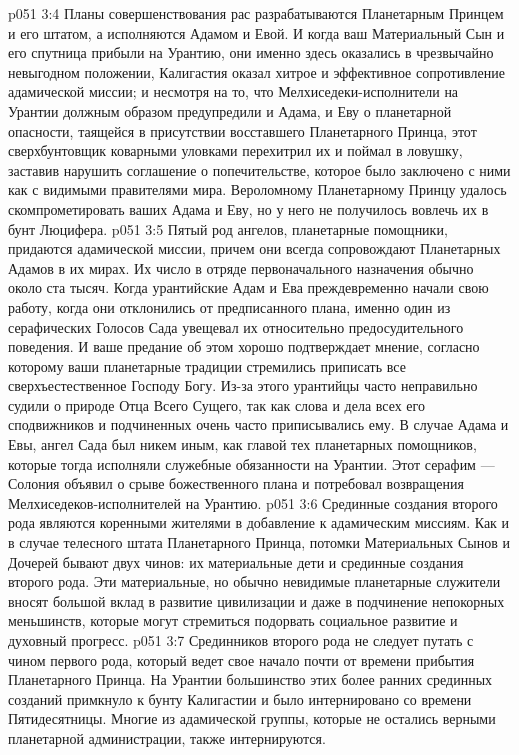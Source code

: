 \vs p051 3:4 Планы совершенствования рас разрабатываются Планетарным Принцем и его штатом, а исполняются Адамом и Евой. И когда ваш Материальный Сын и его спутница прибыли на Урантию, они именно здесь оказались в чрезвычайно невыгодном положении, Калигастия оказал хитрое и эффективное сопротивление адамической миссии; и несмотря на то, что Мелхиседеки\hyp{}исполнители на Урантии должным образом предупредили и Адама, и Еву о планетарной опасности, таящейся в присутствии восставшего Планетарного Принца, этот сверхбунтовщик коварными уловками перехитрил их и поймал в ловушку, заставив нарушить соглашение о попечительстве, которое было заключено с ними как с видимыми правителями мира. Вероломному Планетарному Принцу удалось скомпрометировать ваших Адама и Еву, но у него не получилось вовлечь их в бунт Люцифера.
\vs p051 3:5 \pc Пятый род ангелов, планетарные помощники, придаются адамической миссии, причем они всегда сопровождают Планетарных Адамов в их мирах. Их число в отряде первоначального назначения обычно около ста тысяч. Когда урантийские Адам и Ева преждевременно начали свою работу, когда они отклонились от предписанного плана, именно один из серафических Голосов Сада увещевал их относительно предосудительного поведения. И ваше предание об этом хорошо подтверждает мнение, согласно которому ваши планетарные традиции стремились приписать все сверхъестественное Господу Богу. Из\hyp{}за этого урантийцы часто неправильно судили о природе Отца Всего Сущего, так как слова и дела всех его сподвижников и подчиненных очень часто приписывались ему. В случае Адама и Евы, ангел Сада был никем иным, как главой тех планетарных помощников, которые тогда исполняли служебные обязанности на Урантии. Этот серафим --- Солония объявил о срыве божественного плана и потребовал возвращения Мелхиседеков\hyp{}исполнителей на Урантию.
\vs p051 3:6 \pc Срединные создания второго рода являются коренными жителями в добавление к адамическим миссиям. Как и в случае телесного штата Планетарного Принца, потомки Материальных Сынов и Дочерей бывают двух чинов: их материальные дети и срединные создания второго рода. Эти материальные, но обычно невидимые планетарные служители вносят большой вклад в развитие цивилизации и даже в подчинение непокорных меньшинств, которые могут стремиться подорвать социальное развитие и духовный прогресс.
\vs p051 3:7 Срединников второго рода не следует путать с чином первого рода, который ведет свое начало почти от времени прибытия Планетарного Принца. На Урантии большинство этих более ранних срединных созданий примкнуло к бунту Калигастии и было интернировано со времени Пятидесятницы. Многие из адамической группы, которые не остались верными планетарной администрации, также интернируются.
